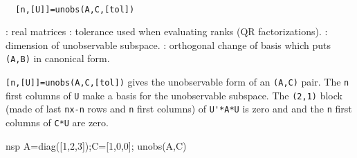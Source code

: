 \begin{mandesc}
   \\ %
\end{mandesc}
\begin{calling_sequence}
\begin{verbatim}
  [n,[U]]=unobs(A,C,[tol])   
\end{verbatim}
\end{calling_sequence}
\begin{parameters}
  \begin{varlist}
    : real matrices
    : tolerance used when evaluating ranks (QR factorizations).
    : dimension of unobservable subspace.
    : orthogonal change of basis which puts \verb!(A,B)! in canonical form.
  \end{varlist}
\end{parameters}
\begin{mandescription}
  \verb![n,[U]]=unobs(A,C,[tol])! gives the unobservable form of an \verb!(A,C)!
  pair.  The \verb!n! first columns of \verb!U! make a basis for the
  unobservable subspace.  The \verb!(2,1)! block (made of last \verb!nx-n! rows
  and \verb!n! first columns) of \verb!U'*A*U! is zero and and the \verb!n!
  first columns of \verb!C*U! are zero.
\end{mandescription}
\begin{examples}
  \begin{mintednsp}{nsp}
    A=diag([1,2,3]);C=[1,0,0];
    unobs(A,C)
  \end{mintednsp}
\end{examples}
\begin{manseealso}
     
      
\end{manseealso}
